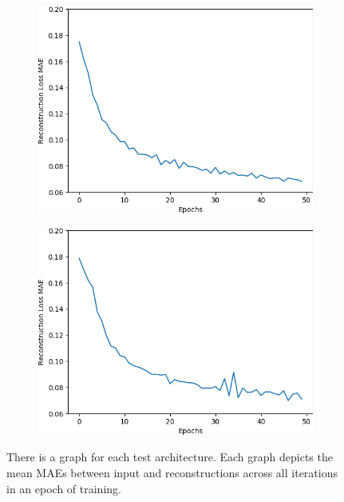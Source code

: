 \begin{figure}[H]
    \begin{subfigure}{.25\textwidth}
        \centering
        \includegraphics[width=\textwidth]
        {images/figures/experiments_architecture/mae_graphKernel3avgPool16x16x32_dim1024.png}
        \caption{}
    \end{subfigure}%
    \begin{subfigure}{.25\textwidth}
        \centering
        \includegraphics[width=\textwidth]
        {images/figures/experiments_architecture/mae_graphKernel3avgPool16x16x64_dim1024.png}
        \caption{}
    \end{subfigure}
    \caption{There is a graph for each test architecture.
    Each graph depicts the mean MAEs between input and reconstructions across 
    all iterations in an epoch of training.} \label{figure_learning_curves4}
\end{figure} 

